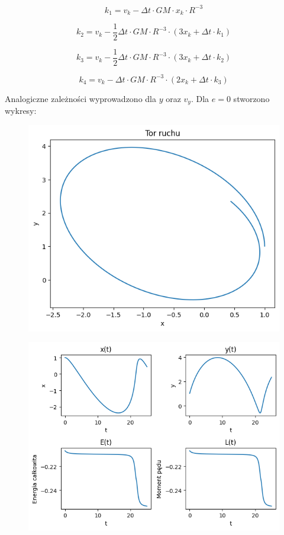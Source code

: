 \documentclass{article}
\begin{document}
	\begin{equation}
		k_1 = v_k - \Delta t \cdot GM \cdot x_k \cdot R^{-3}
	\end{equation}

	\begin{equation}
		k_2 = v_k - \frac{1}{2} \Delta t \cdot GM \cdot R^{-3} \cdot \left( 3x_k + \Delta t \cdot k_1 \right)
	\end{equation}

	\begin{equation}
		k_3 = v_k - \frac{1}{2} \Delta t \cdot GM \cdot R^{-3} \cdot \left( 3x_k + \Delta t \cdot k_2 \right)
	\end{equation}

	\begin{equation}
		k_4 = v_k - \Delta t \cdot GM \cdot R^{-3} \cdot \left( 2x_k + \Delta t \cdot k_3 \right)
	\end{equation}

	\newpage

	Analogiczne zależności wyprowadzono dla $y$ oraz $v_y$. Dla $e = 0$ stworzono wykresy:

	\begin{figure}[h]
		\centering
		\includegraphics[scale = 0.5]{wykres7.png}
	\end{figure}

	\begin{figure}[h]
		\centering
		\includegraphics[scale = 0.70]{wykres8.png}
	\end{figure}




	

	
	
	
\end{document}
